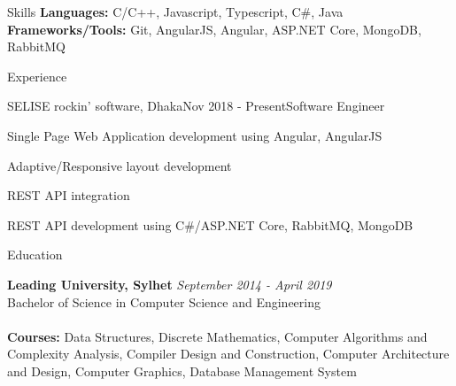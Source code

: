 \documentclass{resume}
\begin{document}

\begin{rSection}{Skills}
{\bf Languages:} C/C++, Javascript, Typescript, C\#, Java\\
{\bf Frameworks/Tools:} Git, AngularJS, Angular, ASP.NET Core, MongoDB, RabbitMQ
\end{rSection}


\begin{rSection}{Experience}

\begin{rSubsection}{SELISE rockin' software, Dhaka}{Nov 2018 - Present}{Software Engineer}{}
\item Single Page Web Application development using Angular, AngularJS
\item Adaptive/Responsive layout development
\item REST API integration
\item REST API development using C\#/ASP.NET Core, RabbitMQ, MongoDB
\end{rSubsection}

\end{rSection}


\begin{rSection}{Education}

{\bf Leading University, Sylhet} \hfill {\em September 2014 - April 2019}
\\ Bachelor of Science in Computer Science and Engineering \\
\\{\bf Courses:} Data Structures, Discrete Mathematics, Computer Algorithms and Complexity Analysis, Compiler Design and Construction, Computer Architecture and Design, Computer Graphics, Database Management System 
\end{rSection}


\end{document}
